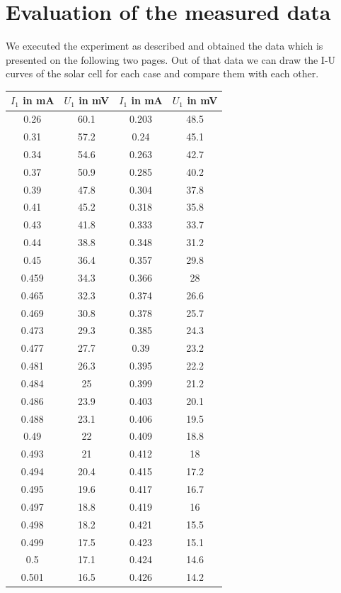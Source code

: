 \documentclass[a4paper, 12pt]{scrartcl}
\begin{document}
\section{Evaluation of the measured data}
We executed the experiment as described and obtained the data which is presented on the following two pages. Out of that data we can draw the I-U curves of the solar cell for each case and compare them with each other.




\begin{table}[H]\begin{tabular}{|c|c|c|c|}\hline
$I_1$ in mA&$U_1$ in mV&$I_1$ in mA&$U_1$ in mV\\\hline\hline
0.26	&	60.1	&	0.203	&	48.5\\
0.31	&	57.2	&	0.24		  &     45.1\\
0.34	&	54.6	&	0.263		&42.7\\
0.37	&	50.9	&	0.285	&	40.2\\
0.39	&	47.8	&	0.304	&	37.8\\
0.41	&	45.2	&	0.318	&	35.8\\
0.43	&	41.8	&	0.333	&	33.7\\
0.44	&	38.8	&	0.348	&	31.2\\
0.45	&	36.4	&	0.357	&	29.8\\
0.459&		34.3	&	0.366	&	28\\
0.465&		32.3	&	0.374	&	26.6\\
0.469&		30.8	&	0.378	&	25.7\\
0.473&		29.3	&	0.385	&	24.3\\
0.477&		27.7	&	0.39		  &      23.2\\
0.481&		26.3	&	0.395		&22.2\\
0.484&		25	&	0.399	&	21.2\\
0.486&		23.9	&	0.403	&	20.1\\
0.488&		23.1	&	0.406	&	19.5\\
0.49	&	       22	&	0.409	&	18.8\\
0.493&		21	&	0.412	&	18\\
0.494&		20.4	&	0.415	&	17.2\\
0.495&		19.6	&	0.417	&	16.7\\
0.497&		18.8	&	0.419	&	16\\
0.498&		18.2	&	0.421	&	15.5\\
0.499&		17.5	&	0.423	&	15.1\\
0.5	&	        17.1	&	0.424	&	14.6\\
0.501&		16.5	&	0.426	&	14.2\\

\end{tabular}
\end{table}
\end{document}
